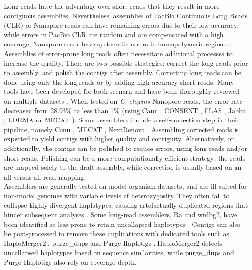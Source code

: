 Long reads have the advantage over short reads that they result in more contiguous assemblies. Nevertheless, assemblies of PacBio Continuous Long Reads (CLR) or Nanopore reads can have remaining errors due to their low accuracy; while errors in PacBio CLR are random and are compensated with a high coverage, Nanopore reads have systematic errors in homopolymeric regions. Assemblies of error-prone long reads often necessitate additional processes to increase the quality. There are two possible strategies: correct the long reads prior to assembly, and polish the contigs after assembly. Correcting long reads can be done using only the long reads or by adding high-accuracy short reads. Many tools have been developed for both scenarii and have been thoroughly reviewed on multiple datasets \cite{correction_benchmark}. When tested on \textit{C. elegans} Nanopore reads, the error rate decreased from 28.93\% to less than 1\% (using Canu \cite{canu}, CONSENT \cite{consent}, FLAS \cite{flas}, Jabba \cite{jabba}, LORMA \cite{lorma} or MECAT \cite{mecat}). Some assemblers include a self-correction step in their pipeline, namely Canu \cite{canu}, MECAT \cite{mecat}, NextDenovo \cite{nextdenovo}. Assembling corrected reads is expected to yield contigs with higher quality and contiguity. Alternatively, or additionally, the contigs can be polished to reduce errors, using long reads and/or short reads. Polishing can be a more computationally efficient strategy: the reads are mapped solely to the draft assembly, while correction is usually based on an all-versus-all read mapping. \\

Assemblers are generally tested on model-organism datasets, and are ill-suited for non-model genomes with variable levels of heterozygosity. They often fail to collapse highly divergent haplotypes, causing artefactually duplicated regions that hinder subsequent analyses \cite{ko2021widespread}. Some long-read assemblers, Ra and wtdbg2, have been identified as less prone to retain uncollapsed haplotypes \cite{guiglielmoni2020}. Contigs can also be post-processed to remove these duplications with dedicated tools such as HaploMerger2 \cite{haplomerger2}, purge\_dups \cite{purge_dups} and Purge Haplotigs \cite{purge_haplotigs}. HaploMerger2 detects uncollapsed haplotypes based on sequence similarities, while purge\_dups and Purge Haplotigs also rely on coverage depth. \\

